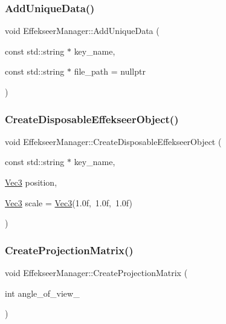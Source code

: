 \subsubsection{\texorpdfstring{Add\+Unique\+Data()}{AddUniqueData()}}
{\footnotesize\ttfamily void Effekseer\+Manager\+::\+Add\+Unique\+Data (\begin{DoxyParamCaption}\item[{const std\+::string $\ast$}]{key\+\_\+name,  }\item[{const std\+::string $\ast$}]{file\+\_\+path = {\ttfamily nullptr} }\end{DoxyParamCaption})\hspace{0.3cm}{\ttfamily [static]}}

\mbox{\label{class_effekseer_manager_a0b82fe25fbe1dacc0d904fb54267b2fa}} 
\subsubsection{\texorpdfstring{Create\+Disposable\+Effekseer\+Object()}{CreateDisposableEffekseerObject()}}
{\footnotesize\ttfamily void Effekseer\+Manager\+::\+Create\+Disposable\+Effekseer\+Object (\begin{DoxyParamCaption}\item[{const std\+::string $\ast$}]{key\+\_\+name,  }\item[{\mbox{\hyperlink{_vector3_d_8h_ab16f59e4393f29a01ec8b9bbbabbe65d}{Vec3}}}]{position,  }\item[{\mbox{\hyperlink{_vector3_d_8h_ab16f59e4393f29a01ec8b9bbbabbe65d}{Vec3}}}]{scale = {\ttfamily \mbox{\hyperlink{_vector3_d_8h_ab16f59e4393f29a01ec8b9bbbabbe65d}{Vec3}}(1.0f,~1.0f,~1.0f)} }\end{DoxyParamCaption})\hspace{0.3cm}{\ttfamily [static]}}

\mbox{\label{class_effekseer_manager_ae4faa1c46f9b4a372559567748df2384}} 
\subsubsection{\texorpdfstring{Create\+Projection\+Matrix()}{CreateProjectionMatrix()}}
{\footnotesize\ttfamily void Effekseer\+Manager\+::\+Create\+Projection\+Matrix (\begin{DoxyParamCaption}\item[{int}]{angle\+\_\+of\+\_\+view\+\_\+ }\end{DoxyParamCaption})\hspace{0.3cm}{\ttfamily [static]}}

